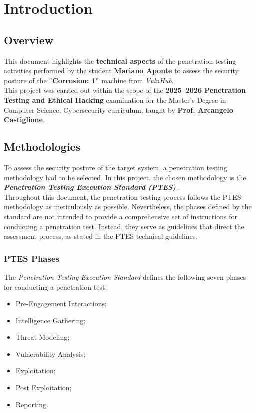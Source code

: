 \chapter{Introduction}

\section{Overview}

This document highlights the \textbf{technical aspects} of the penetration testing activities performed by the student \textbf{Mariano Aponte} to assess the security posture of the \textbf{"Corrosion: 1"} machine from \textit{VulnHub}.
\\

This project was carried out within the scope of the \textbf{2025--2026 Penetration Testing and Ethical Hacking} examination for the Master's Degree in Computer Science, Cybersecurity curriculum, taught by \textbf{Prof. Arcangelo Castiglione}.

\section{Methodologies}

To assess the security posture of the target system, a penetration testing methodology had to be selected. In this project, the chosen methodology is the \textbf{\textit{Penetration Testing Execution Standard (PTES)}} \cite{ptes}.
\\

Throughout this document, the penetration testing process follows the PTES methodology as meticulously as possible. Nevertheless, the phases defined by the standard are not intended to provide a comprehensive set of instructions for conducting a penetration test. Instead, they serve as guidelines that direct the assessment process, as stated in the PTES technical guidelines.
\\

\subsection{PTES Phases}

The \textit{Penetration Testing Execution Standard} defines the following seven phases for conducting a penetration test:

\begin{itemize}
    \item Pre-Engagement Interactions;
    \item Intelligence Gathering;
    \item Threat Modeling;
    \item Vulnerability Analysis;
    \item Exploitation;
    \item Post Exploitation;
    \item Reporting.
\end{itemize}

